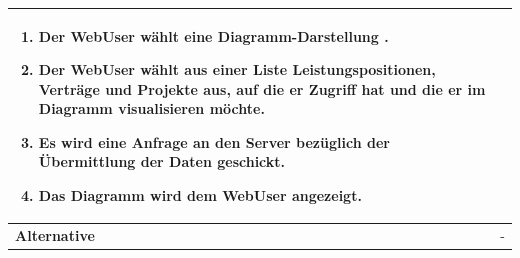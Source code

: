 \begin{longtable}[c]{|p{4cm}|p{10cm}|}
\begin{enumerate}
        \item Der WebUser wählt eine Diagramm-Darstellung .
        \item Der WebUser wählt aus einer Liste Leistungspositionen, Verträge und Projekte aus, auf die er Zugriff hat und die er im Diagramm visualisieren möchte.
        \item Es wird eine Anfrage an den Server bezüglich der Übermittlung der Daten geschickt.
        \item Das Diagramm wird dem WebUser angezeigt.
    \end{enumerate}                                                                                                                                                                                                                                 \\ \hline

    \textbf{Alternative}                & -                                                                                                                                                                                                                    \\ \hline


\end{longtable}
